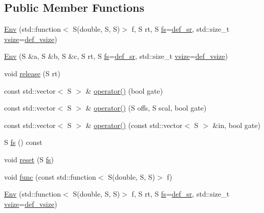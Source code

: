 \subsection*{Public Member Functions}
\begin{DoxyCompactItemize}
\item 
\hyperlink{class_aurora_1_1_env_a500fe7e05d736a21c801ffa480aceed7}{Env} (std\+::function$<$ S(double, S, S)$>$ f, S rt, S \hyperlink{class_aurora_1_1_env_a8b83ca686cce4fc31b03b1de847bc062}{fs}=\hyperlink{namespace_aurora_ad49263d809bea98dd422e95bc91bc03e}{def\+\_\+sr}, std\+::size\+\_\+t \hyperlink{class_aurora_1_1_snd_base_af9e21aaf411b17f7a8221c991ce5d291}{vsize}=\hyperlink{namespace_aurora_afaaddf667a06e7ce23c667a8b7295263}{def\+\_\+vsize})
\item 
\hyperlink{class_aurora_1_1_env_a3ea4ee867e90f80331819cceacc55942}{Env} (S \&a, S \&b, S \&c, S rt, S \hyperlink{class_aurora_1_1_env_a8b83ca686cce4fc31b03b1de847bc062}{fs}=\hyperlink{namespace_aurora_ad49263d809bea98dd422e95bc91bc03e}{def\+\_\+sr}, std\+::size\+\_\+t \hyperlink{class_aurora_1_1_snd_base_af9e21aaf411b17f7a8221c991ce5d291}{vsize}=\hyperlink{namespace_aurora_afaaddf667a06e7ce23c667a8b7295263}{def\+\_\+vsize})
\item 
void \hyperlink{class_aurora_1_1_env_a2e52ca727b587d89e13a6c3832786f22}{release} (S rt)
\item 
const std\+::vector$<$ S $>$ \& \hyperlink{class_aurora_1_1_env_ae4e2dec694f0be0f0efa5b073a06fef5}{operator()} (bool gate)
\item 
const std\+::vector$<$ S $>$ \& \hyperlink{class_aurora_1_1_env_a664e3c6ce7e66de66305ab220c116792}{operator()} (S offs, S scal, bool gate)
\item 
const std\+::vector$<$ S $>$ \& \hyperlink{class_aurora_1_1_env_aa60b54171a8ae1757d447aa42d5d00c7}{operator()} (const std\+::vector$<$ S $>$ \&in, bool gate)
\item 
S \hyperlink{class_aurora_1_1_env_a8b83ca686cce4fc31b03b1de847bc062}{fs} () const
\item 
void \hyperlink{class_aurora_1_1_env_a12db5d285b749a7e1fed988d344d3bc9}{reset} (S \hyperlink{class_aurora_1_1_env_a8b83ca686cce4fc31b03b1de847bc062}{fs})
\item 
void \hyperlink{class_aurora_1_1_env_a92aec91bb78127cf50d5d841870cce14}{func} (const std\+::function$<$ S(double, S, S)$>$ f)
\item 
\hyperlink{class_aurora_1_1_env_a500fe7e05d736a21c801ffa480aceed7}{Env} (std\+::function$<$ S(double, S, S)$>$ f, S rt, S \hyperlink{class_aurora_1_1_env_a8b83ca686cce4fc31b03b1de847bc062}{fs}=\hyperlink{namespace_aurora_ad49263d809bea98dd422e95bc91bc03e}{def\+\_\+sr}, std\+::size\+\_\+t \hyperlink{class_aurora_1_1_snd_base_af9e21aaf411b17f7a8221c991ce5d291}{vsize}=\hyperlink{namespace_aurora_afaaddf667a06e7ce23c667a8b7295263}{def\+\_\+vsize})

\end{DoxyCompactItemize}
